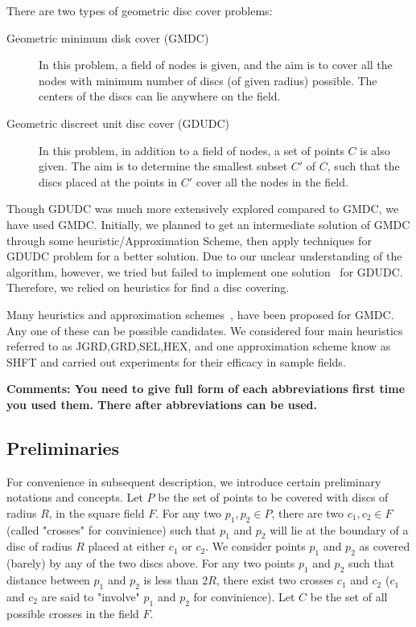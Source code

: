 There are two types of geometric disc cover problems:

\begin{description}
\item[Geometric minimum disk cover (GMDC)] In this problem, a field of nodes is given, and the aim is to cover all the nodes with minimum number of discs (of given radius) possible. The centers of the discs can lie anywhere on the field.
\item[Geometric discreet unit disc cover (GDUDC)] In this problem, in addition to a field of nodes, a set of points $C$ is also given. The aim is to determine the smallest subset $C'$ of $C$, such that the discs placed at the points in $C'$ cover all the nodes in the field.
\end{description}

Though GDUDC was much more extensively explored compared to GMDC, we have 
used GMDC. Initially, we planned to get an intermediate solution of GMDC through some heuristic/Approximation Scheme, then apply techniques for GDUDC problem for a better solution. Due to our unclear understanding of the algorithm, however, we tried but failed to implement one solution~\cite{carmi} for GDUDC. Therefore, we relied on heuristics for find a disc covering.

Many heuristics and approximation schemes~\cite{shifting}, \cite{appScheme} have been proposed for GMDC. Any one of these can be possible candidates. We considered four main heuristics referred to as JGRD,GRD,SEL,HEX, and one approximation scheme know as SHFT and carried out experiments for their efficacy in sample fields. 

{\bf Comments: You need to give full form of each abbreviations first time you used them. There after abbreviations can be used.}

\subsection{Preliminaries}\label{subsec:prelim}

For convenience in subsequent description, we introduce certain preliminary
notations and concepts. Let $P$ be the set of points to be covered with discs of radius $R$, in the square field $F$. For any two $p_1, p_2 \in P$, there are two $c_1,c_2 \in F$ (called "crosses" for convinience) such that $p_1$ and $p_2$ will lie at the boundary of a disc of radius $R$ placed at either $c_1$ or $c_2$. We consider points $p_1$ and $p_2$ as covered (barely) by any of the two discs above. For any two points $p_1$ and $p_2$ such that distance between $p_1$ and $p_2$ is less than $2R$, there exist two crosses $c_1$ and $c_2$ ($c_1$ and $c_2$ are said to "involve" $p_1$ and $p_2$ for convinience). Let $C$ be the set of all possible crosses in the field $F$.

